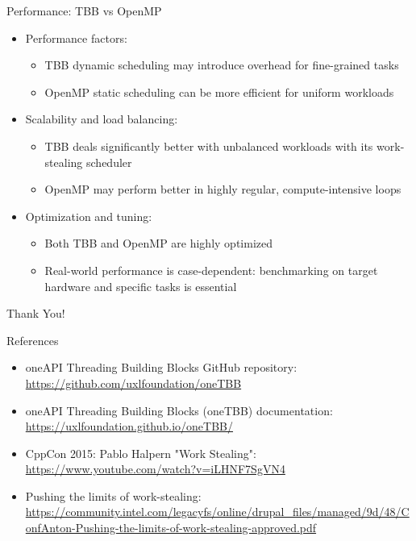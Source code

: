 \documentclass{beamer}
\begin{document}
\begin{frame}{Performance: TBB vs OpenMP}
  \begin{itemize}
    \item Performance factors:
      \begin{itemize}
        \item TBB dynamic scheduling may introduce overhead for fine-grained tasks
        \item OpenMP static scheduling can be more efficient for uniform workloads
      \end{itemize}
    \item Scalability and load balancing:
      \begin{itemize}
        \item TBB deals significantly better with unbalanced workloads with its work-stealing scheduler
        \item OpenMP may perform better in highly regular, compute-intensive loops
      \end{itemize}
    \item Optimization and tuning:
      \begin{itemize}
        \item Both TBB and OpenMP are highly optimized
        \item Real-world performance is case-dependent: benchmarking on target hardware and specific tasks is essential
      \end{itemize}
  \end{itemize}
\end{frame}

\begin{frame}
  \centering
  \Huge{Thank You!}
\end{frame}

\begin{frame}{References}
  \begin{itemize}
    \item oneAPI Threading Building Blocks GitHub repository: \url{https://github.com/uxlfoundation/oneTBB}
    \item oneAPI Threading Building Blocks (oneTBB) documentation: \url{https://uxlfoundation.github.io/oneTBB/}
    \item CppCon 2015: Pablo Halpern "Work Stealing": \url{https://www.youtube.com/watch?v=iLHNF7SgVN4}
    \item Pushing the limits of work-stealing: \url{https://community.intel.com/legacyfs/online/drupal_files/managed/9d/48/ConfAnton-Pushing-the-limits-of-work-stealing-approved.pdf}
  \end{itemize}
\end{frame}
\end{document}
